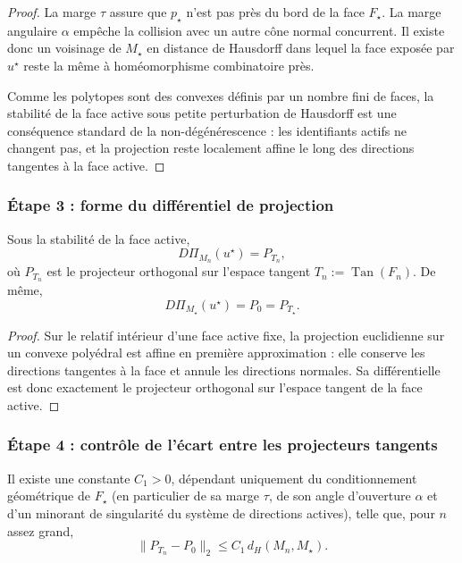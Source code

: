 \begin{proof}
La marge \(\tau\) assure que \(p_\star\) n'est pas près du bord de la face \(F_\star\). La marge angulaire \(\alpha\) empêche la collision avec un autre cône normal concurrent. Il existe donc un voisinage de \(M_\star\) en distance de Hausdorff dans lequel la face exposée par \(u^\star\) reste la même à homéomorphisme combinatoire près.

Comme les polytopes sont des convexes définis par un nombre fini de faces, la stabilité de la face active sous petite perturbation de Hausdorff est une conséquence standard de la non-dégénérescence : les identifiants actifs ne changent pas, et la projection reste localement affine le long des directions tangentes à la face active.
\end{proof}

\subsubsection{Étape 3 : forme du différentiel de projection}

\begin{proposition}
Sous la stabilité de la face active,
\[
D\Pi_{M_n}(u^\star)=P_{T_n},
\]
où \(P_{T_n}\) est le projecteur orthogonal sur l'espace tangent \(T_n:=\operatorname{Tan}(F_n)\). De même,
\[
D\Pi_{M_\star}(u^\star)=P_0=P_{T_\star}.
\]
\end{proposition}

\begin{proof}
Sur le relatif intérieur d'une face active fixe, la projection euclidienne sur un convexe polyédral est affine en première approximation : elle conserve les directions tangentes à la face et annule les directions normales. Sa différentielle est donc exactement le projecteur orthogonal sur l'espace tangent de la face active.
\end{proof}

\subsubsection{Étape 4 : contrôle de l'écart entre les projecteurs tangents}

\begin{lemma}
Il existe une constante \(C_1>0\), dépendant uniquement du conditionnement géométrique de \(F_\star\) (en particulier de sa marge \(\tau\), de son angle d'ouverture \(\alpha\) et d'un minorant de singularité du système de directions actives), telle que, pour \(n\) assez grand,
\[
\|P_{T_n}-P_0\|_2 \le C_1\, d_H(M_n,M_\star).
\]
\end{lemma}

